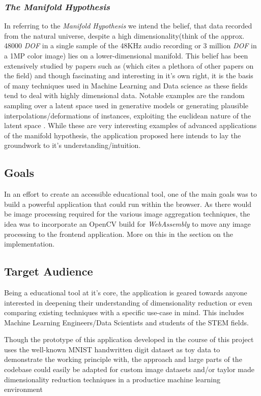 \documentclass[11pt,a4paper]{article}
\begin{document}
  \subsubsection*{ \textit{The Manifold Hypothesis}}
  In referring to the \textit{Manifold Hypothesis} we intend the belief, that data recorded from the natural universe, despite a high dimensionality(think of the  approx. 48000 \textit{DOF} in a single sample of the 48KHz audio recording or 3 million \textit{DOF} in a 1MP color image) lies on a lower-dimensional manifold. This belief has been extensively studied by papers such as \cite{fefferman_testing_2016}(which cites a plethora of other papers on the field) and though fascinating and interesting in it's own right, it is the basis of many techniques used in Machine Learning and Data science as these fields tend to deal with highly dimensional data. 
  Notable examples are the random sampling over a latent space used in generative models \cite{razavi_generating_2019} or generating plausible interpolations/deformations of instances, exploiting the euclidean nature of the latent space \cite{cosmo_limp_2020}.
  While these are very interesting examples of advanced applications of the manifold hypothesis, the application proposed here intends to lay the groundwork to it's understanding/intuition.

  \subsection {Goals}
    In an effort to create an accessible educational tool, one of the main goals was to build a powerful application that could run within the browser. As there would be image processing required for the various image aggregation techniques, the idea was to incorporate an OpenCV build for \textit{WebAssembly} to move any image processing to the frontend application. More on this in the section on the implementation.
  \subsection{Target Audience}
    Being a educational tool at it's core, the application is geared towards anyone interested in deepening their understanding of dimensionality reduction or even comparing existing techniques with a specific use-case in mind. This includes Machine Learning Engineers/Data Scientists and students of the STEM fields.

    Though the prototype of this application developed in the course of this project uses the well-known MNIST handwritten digit dataset as toy data to demonstrate the working principle with, the approach and large parts of the codebase could easily  be adapted for custom image datasets and/or taylor made dimensionality reduction techniques in a productice machine learning environment
\end{document}
